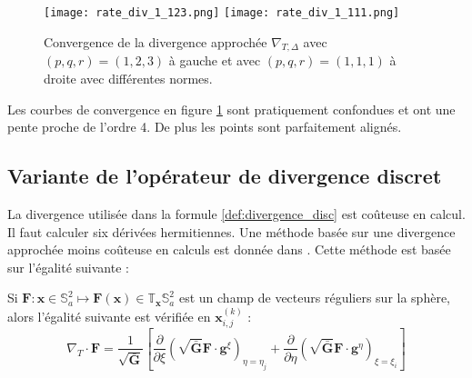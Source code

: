 \begin{figure}[htbp]
\begin{center}
\texttt{[image: rate\_div\_1\_123.png]}
\texttt{[image: rate\_div\_1\_111.png]}
\end{center}
\caption{Convergence de la divergence approchée $\nabla_{T,\Delta}$ avec $(p,q,r)=(1,2,3)$ à gauche et avec $(p,q,r)=(1,1,1)$ à droite avec différentes normes.}
\label{fig:rate_div1}
\end{figure}

Les courbes de convergence en figure \ref{fig:rate_div1} sont pratiquement confondues et ont une pente proche de l'ordre 4. De plus les points sont parfaitement alignés.


\subsection{Variante de l'opérateur de divergence discret}

La divergence utilisée dans la formule \eqref{def:divergence_disc} est coûteuse en calcul. Il faut calculer six dérivées hermitiennes. Une méthode basée sur une divergence approchée moins coûteuse en calculs est donnée dans \cite{Croisille2015}. Cette méthode est basée sur l'égalité suivante :

\begin{proposition}
Si $\mathbf{F} : \mathbf{x} \in \mathbb{S}_a^2 \mapsto \mathbf{F}(\mathbf{x}) \in \mathbb{T}_{\mathbf{x}} \mathbb{S}_a^2$ est un champ de vecteurs réguliers sur la sphère, alors l'égalité suivante est vérifiée en $\mathbf{x}_{i,j}^{(k)}$ :
\begin{equation}
\nabla_T \cdot \mathbf{F} = \dfrac{1}{\sqrt{\bar{\mathbf{G}}}} \left[ \dfrac{\partial}{\partial \xi} \left( \sqrt{\bar{\mathbf{G}}} \mathbf{F} \cdot \mathbf{g}^{\xi} \right)_{\eta = \eta_j} + 
\dfrac{\partial}{\partial \eta} \left( \sqrt{\bar{\mathbf{G}}} \mathbf{F} \cdot \mathbf{g}^{\eta} \right)_{\xi = \xi_i}
\right]
\label{eq:divergence_v2}
\end{equation}
\end{proposition}

